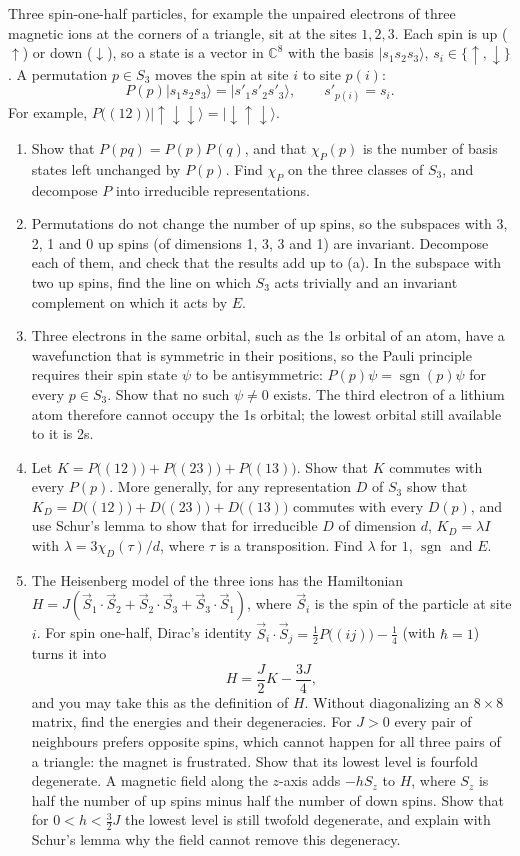 \documentclass[11pt,a4paper]{article}
\newcommand{\C}{\mathbb{C}}
\DeclareMathOperator{\sgn}{sgn}
\newcommand{\ket}[1]{\lvert #1\rangle}
\newcommand{\up}{{\uparrow}}
\newcommand{\dn}{{\downarrow}}
\newcommand{\problem}[1]{\par\vspace{0.9em}\noindent{\bfseries #1}\par\vspace{0.1em}}
\begin{document}
\problem{4. Three spins on a triangle}
Three spin-one-half particles, for example the unpaired electrons of three magnetic ions at the corners of a triangle, sit at the sites $1, 2, 3$. Each spin is up ($\up$) or down ($\dn$), so a state is a vector in $\C^8$ with the basis $\ket{s_1s_2s_3}$, $s_i \in \{\up, \dn\}$. A permutation $p \in S_3$ moves the spin at site $i$ to site $p(i)$:
\[
  P(p)\ket{s_1s_2s_3} = \ket{s'_1s'_2s'_3}, \qquad s'_{p(i)} = s_i.
\]
For example, $P\bigl((12)\bigr)\ket{\up\dn\dn} = \ket{\dn\up\dn}$.
\begin{enumerate}
  \item Show that $P(pq) = P(p)P(q)$, and that $\chi_P(p)$ is the number of basis states left unchanged by $P(p)$. Find $\chi_P$ on the three classes of $S_3$, and decompose $P$ into irreducible representations.
  \item Permutations do not change the number of up spins, so the subspaces with 3, 2, 1 and 0 up spins (of dimensions 1, 3, 3 and 1) are invariant. Decompose each of them, and check that the results add up to (a). In the subspace with two up spins, find the line on which $S_3$ acts trivially and an invariant complement on which it acts by $E$.
  \item Three electrons in the same orbital, such as the 1s orbital of an atom, have a wavefunction that is symmetric in their positions, so the Pauli principle requires their spin state $\psi$ to be antisymmetric: $P(p)\psi = \sgn(p)\psi$ for every $p \in S_3$. Show that no such $\psi \ne 0$ exists. The third electron of a lithium atom therefore cannot occupy the 1s orbital; the lowest orbital still available to it is 2s.
  \item Let $K = P\bigl((12)\bigr) + P\bigl((23)\bigr) + P\bigl((13)\bigr)$. Show that $K$ commutes with every $P(p)$. More generally, for any representation $D$ of $S_3$ show that $K_D = D\bigl((12)\bigr) + D\bigl((23)\bigr) + D\bigl((13)\bigr)$ commutes with every $D(p)$, and use Schur's lemma to show that for irreducible $D$ of dimension $d$, $K_D = \lambda I$ with $\lambda = 3\chi_D(\tau)/d$, where $\tau$ is a transposition. Find $\lambda$ for $1$, $\sgn$ and $E$.
  \item The Heisenberg model of the three ions has the Hamiltonian $H = J(\vec S_1\cdot\vec S_2 + \vec S_2\cdot\vec S_3 + \vec S_3\cdot\vec S_1)$, where $\vec S_i$ is the spin of the particle at site $i$. For spin one-half, Dirac's identity $\vec S_i\cdot\vec S_j = \tfrac12 P\bigl((ij)\bigr) - \tfrac14$ (with $\hbar = 1$) turns it into
  \[
    H = \frac{J}{2}K - \frac{3J}{4},
  \]
  and you may take this as the definition of $H$. Without diagonalizing an $8 \times 8$ matrix, find the energies and their degeneracies. For $J > 0$ every pair of neighbours prefers opposite spins, which cannot happen for all three pairs of a triangle: the magnet is frustrated. Show that its lowest level is fourfold degenerate. A magnetic field along the $z$-axis adds $-hS_z$ to $H$, where $S_z$ is half the number of up spins minus half the number of down spins. Show that for $0 < h < \tfrac32 J$ the lowest level is still twofold degenerate, and explain with Schur's lemma why the field cannot remove this degeneracy.
\end{enumerate}
\end{document}
